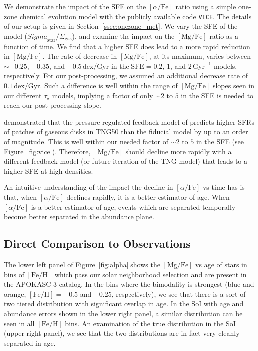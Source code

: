\documentclass[twocolumn]{aastex631}
\newcommand{\Gyr}{\ensuremath{\textrm{Gyr}}}
\newcommand{\FeH}{\ensuremath{[\textrm{Fe}/\textrm{H}]}}
\newcommand{\MgFe}{\ensuremath{[\textrm{Mg}/\textrm{Fe}]}}
\newcommand{\alphaFe}{\ensuremath{[\alpha/\textrm{Fe}]}}
\newcommand{\dex}{\ensuremath{\textrm{dex}}}
\begin{document}
We demonstrate the impact of the SFE on the \alphaFe{} ratio using a simple one-zone chemical evolution model with the publicly available code \texttt{VICE}. The details of our setup is given in Section~\ref{ssec:onezone_met}. We vary the SFE of the model ($\dot{Sigma}_{\textrm{star}}/\Sigma_{\textrm{gas}}$), and examine the impact on the \MgFe{} ratio as a function of time. We find that a higher SFE does lead to a more rapid reduction in \MgFe{}. The rate of decrease in \MgFe{}, at its maximum, varies between $\sim-0.25$, $-0.35$, and $-0.5\,\dex/\Gyr$ in the $\textrm{SFE}=0.2$, $1$, and $2\,\Gyr^{-1}$ models, respectively. For our post-processing, we assumed an additional decrease rate of $0.1\,\dex/\Gyr$. Such a difference is well within the range of \MgFe{} slopes seen in our different $\tau_{\star}$ models, implying a factor of only $\sim2$ to $5$ in the SFE is needed to reach our post-processing slope.

\citet{2024arXiv240909121H} demonstrated that the pressure regulated feedback model of \citet{2022ApJ...936..137O} predicts higher SFRs of patches of gaseous disks in TNG50 than the fiducial model by up to an order of magnitude. This is well within our needed factor of $\sim2$ to $5$ in the SFE (see Figure~\ref{fig:vice}). Therefore, \MgFe{} should decline more rapidly with a different feedback model (or future iteration of the TNG model) that leads to a higher SFE at high densities.

An intuitive understanding of the impact the decline in \alphaFe{} vs time has is that, when \alphaFe{} declines rapidly, it is a better estimator of age. When \alphaFe{} is a better estimator of age, events which are separated temporally become better separated in the abundance plane.

\subsection{Direct Comparison to Observations}\label{ssec:compare_obs}
The lower left panel of Figure~\ref{fig:alpha} shows the \MgFe{} vs age of stars in bins of \FeH{} which pass our solar neighborhood selection and are present in the APOKASC-3 catalog. In the bins where the bimodality is strongest (blue and orange, $\FeH=-0.5$ and $-0.25$, respectively), we see that there is a sort of two tiered distribution with significant overlap in age. In the SoI with age and abundance errors shown in the lower right panel, a similar distribution can be seen in all \FeH{} bins. An examination of the true distribution in the SoI (upper right panel), we see that the two distributions are in fact very cleanly separated in age.
\end{document}

